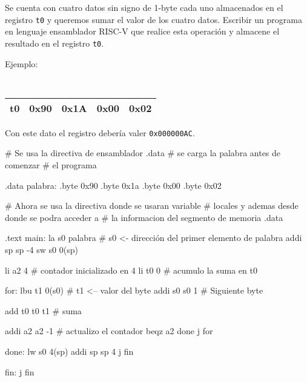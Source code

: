 \begin{enunciado}{\ejercicio}
  Se cuenta con cuatro datos sin signo de 1-byte cada uno almacenados en el registro \texttt{t0} y queremos sumar el valor de los cuatro datos.
  Escribir un programa en lenguaje ensamblador RISC-V que realice esta operación y almacene el resultado en el registro \texttt{t0}.

  Ejemplo:
  \begin{center}
    { \tt
      \begin{tabular}{|c|c|c|c|c|}
        \hline
        t0 & 0x90 & 0x1A & 0x00 & 0x02 \\
        \hline
      \end{tabular}
    }
  \end{center}
  Con este dato el registro debería valer \texttt{0x000000AC}.
\end{enunciado}


\begin{riscv}
# Se usa la directiva de ensamblador .data
# se carga la palabra antes de comenzar 
# el programa

.data
    palabra: .byte 0x90
             .byte 0x1a
             .byte 0x00
             .byte 0x02

# Ahora se usa la directiva donde se usaran variable
# locales y ademas desde donde se podra acceder a 
# la informacion del segmento de memoria .data

.text
main:
    la s0 palabra   # s0 <- dirección del primer elemento de palabra 
    addi sp sp -4
    sw s0 0(sp)
    
    li a2 4 # contador inicializado en 4
    li t0 0 # acumulo la suma en t0
    
    for:
        lbu t1 0(s0) # t1 <-- valor del byte
        addi s0 s0 1 # Siguiente byte
        
        add t0 t0 t1 # suma
        
        addi a2 a2 -1 # actualizo el contador
        beqz a2 done
    j for
    
done:
    lw s0 4(sp)
    addi sp sp 4
    j fin
     
fin: j fin
\end{riscv}

